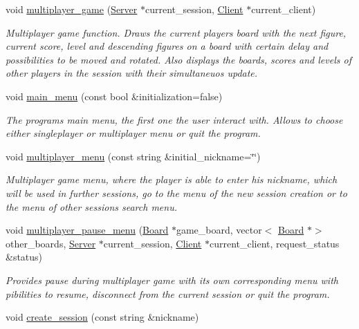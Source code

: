 \begin{DoxyCompactItemize}
void \hyperlink{classMenu_ad0ebc9b36a72588250f2be1771d27673}{multiplayer\+\_\+game} (\hyperlink{classServer}{Server} $\ast$current\+\_\+session, \hyperlink{classClient}{Client} $\ast$current\+\_\+client)
\begin{DoxyCompactList}\small\item\em Multiplayer game function. Draws the current player\textquotesingle{}s board with the next figure, current score, level and descending figures on a board with certain delay and possibilities to be moved and rotated. Also displays the boards, scores and levels of other players in the session with their simultaneuos update. \end{DoxyCompactList}\item 
void \hyperlink{classMenu_a6879a11cc8663b9866521c262459e749}{main\+\_\+menu} (const bool \&initialization=false)
\begin{DoxyCompactList}\small\item\em The program\textquotesingle{}s main menu, the first one the user interact with. Allows to choose either singleplayer or multiplayer menu or quit the program. \end{DoxyCompactList}\item 
void \hyperlink{classMenu_a04783a738aaaf81187b65879dfb6a693}{multiplayer\+\_\+menu} (const string \&initial\+\_\+nickname=\char`\"{}\char`\"{})
\begin{DoxyCompactList}\small\item\em Multiplayer game menu, where the player is able to enter his nickname, which will be used in further sessions, go to the menu of the new session creation or to the menu of other sessions search menu. \end{DoxyCompactList}\item 
void \hyperlink{classMenu_ab0d97134d6183cf65ee36f6b45171d60}{multiplayer\+\_\+pause\+\_\+menu} (\hyperlink{classBoard}{Board} $\ast$game\+\_\+board, vector$<$ \hyperlink{classBoard}{Board} $\ast$$>$ other\+\_\+boards, \hyperlink{classServer}{Server} $\ast$current\+\_\+session, \hyperlink{classClient}{Client} $\ast$current\+\_\+client, request\+\_\+status \&status)
\begin{DoxyCompactList}\small\item\em Provides pause during multiplayer game with its own corresponding menu with pibilities to resume, disconnect from the current session or quit the program. \end{DoxyCompactList}\item 
void \hyperlink{classMenu_a14fd150a078fc9d28c681e81a4367e86}{create\+\_\+session} (const string \&nickname)
$$
\end{DoxyCompactItemize}
